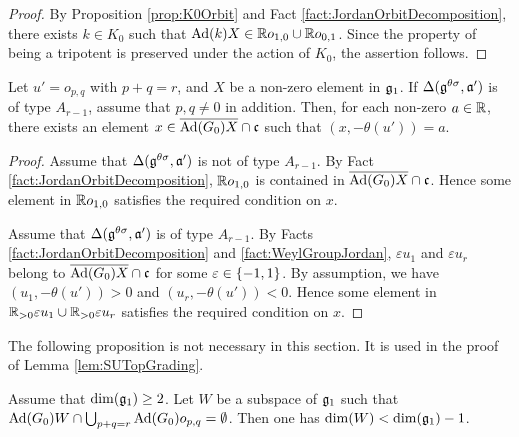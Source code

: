 \begin{proof}
	By Proposition \ref{prop:K0Orbit} and Fact \ref{fact:JordanOrbitDecomposition}, there exists $k\in K_0$ such that $\mathrm{Ad}(k)X \in \mathbb{R} o_{1, 0} \cup \mathbb{R} o_{0, 1}$.
	Since the property of being a tripotent is preserved under the action of $K_0$, the assertion follows.
\end{proof}


\begin{lemma} \label{lem:JordanAnyInnerProduct}
	Let $u' = o_{p,q}$ with $p+q = r$, and $X$ be a non-zero element in $\mathfrak{g}_1$.
	If $\Delta(\mathfrak{g}^{\theta\sigma}, \mathfrak{a'})$ is of type $A_{r-1}$, assume that $p, q\neq 0$ in addition.
	Then, for each non-zero $a \in \mathbb{R}$, there exists an element $x \in \overline{\mathrm{Ad}(G_0)X} \cap \mathfrak{c}$ such that $(x, -\theta(u')) = a$.
\end{lemma}

\begin{proof}
	Assume that $\Delta(\mathfrak{g}^{\theta\sigma}, \mathfrak{a'})$ is not of type $A_{r-1}$.
	By Fact \ref{fact:JordanOrbitDecomposition}, $\mathbb{R} o_{1, 0}$ is contained in $\overline{\mathrm{Ad}(G_0)X} \cap \mathfrak{c}$.
	Hence some element in $\mathbb{R} o_{1, 0}$ satisfies the required condition on $x$.

	Assume that $\Delta(\mathfrak{g}^{\theta\sigma}, \mathfrak{a'})$ is of type $A_{r-1}$.
	By Facts \ref{fact:JordanOrbitDecomposition} and \ref{fact:WeylGroupJordan}, $\varepsilon u_1$ and $\varepsilon u_r$ belong to $\overline{\mathrm{Ad}(G_0)X} \cap \mathfrak{c}$ for some $\varepsilon \in \left\{-1, 1 \right\}$.
	By assumption, we have $(u_1, -\theta(u')) > 0$ and $(u_r, -\theta(u')) < 0$.
	Hence some element in $\mathbb{R}_{>0} \varepsilon u_1 \cup \mathbb{R}_{>0} \varepsilon u_r$ satisfies the required condition on $x$.
\end{proof}

The following proposition is not necessary in this section.
It is used in the proof of Lemma \ref{lem:SUTopGrading}.

\begin{proposition} \label{prop:CodimensionOneJordan}
	Assume that $\dim(\mathfrak{g}_1) \geq 2$.
	Let $W$ be a subspace of $\mathfrak{g}_1$ such that $\mathrm{Ad}(G_0)W \cap \bigcup_{p+q=r} \mathrm{Ad}(G_0)o_{p,q} = \emptyset$.
	Then one has $\dim(W) < \dim(\mathfrak{g}_1) - 1$.
\end{proposition}

